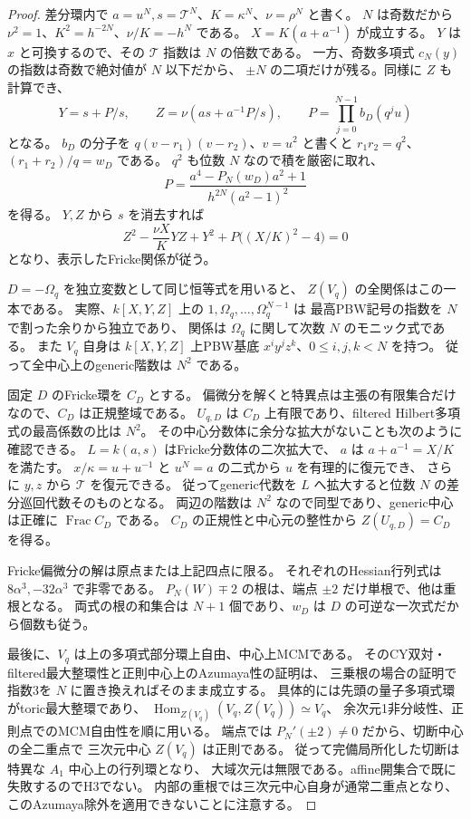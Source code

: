 \begin{proof}
差分環内で $a=u^N,s=\mathcal T^N$、$K=\kappa^N$、$\nu=\rho^N$ と書く。
$N$ は奇数だから $\nu^2=1$、$K^2=h^{-2N}$、$\nu/K=-h^N$ である。
$X=K(a+a^{-1})$ が成立する。
$Y$ は $x$ と可換するので、その $\mathcal T$ 指数は $N$ の倍数である。
一方、奇数多項式 $c_N(y)$ の指数は奇数で絶対値が $N$ 以下だから、
$\pm N$ の二項だけが残る。同様に $Z$ も計算でき、
\[
 Y=s+P/s,\qquad Z=\nu(as+a^{-1}P/s),\qquad
 P=\prod_{j=0}^{N-1}b_D(q^ju)
\]
となる。
$b_D$ の分子を $q(v-r_1)(v-r_2)$、$v=u^2$ と書くと
$r_1r_2=q^2$、$(r_1+r_2)/q=w_D$ である。
$q^2$ も位数 $N$ なので積を厳密に取れ、
\[
 P=\frac{a^4-P_N(w_D)a^2+1}{h^{2N}(a^2-1)^2}
\]
を得る。
$Y,Z$ から $s$ を消去すれば
\[
 Z^2-\frac{\nu X}{K}YZ+Y^2+
 P\bigl((X/K)^2-4\bigr)=0
\]
となり、表示したFricke関係が従う。

$D=-\Omega_q$ を独立変数として同じ恒等式を用いると、
$Z(V_q)$ の全関係はこの一本である。
実際、$k[X,Y,Z]$ 上の $1,\Omega_q,\ldots,\Omega_q^{N-1}$ は
最高PBW記号の指数を $N$ で割った余りから独立であり、
関係は $\Omega_q$ に関して次数 $N$ のモニック式である。
また $V_q$ 自身は $k[X,Y,Z]$ 上PBW基底 $x^iy^jz^k$、$0\le i,j,k<N$ を持つ。
従って全中心上のgeneric階数は $N^2$ である。

固定 $D$ のFricke環を $C_D$ とする。
偏微分を解くと特異点は主張の有限集合だけなので、$C_D$ は正規整域である。
$U_{q,D}$ は $C_D$ 上有限であり、filtered Hilbert多項式の最高係数の比は $N^2$。
その中心分数体に余分な拡大がないことも次のように確認できる。
$L=k(a,s)$ はFricke分数体の二次拡大で、
$a$ は $a+a^{-1}=X/K$ を満たす。
$x/\kappa=u+u^{-1}$ と $u^N=a$ の二式から $u$ を有理的に復元でき、
さらに $y,z$ から $\mathcal T$ を復元できる。
従ってgeneric代数を $L$ へ拡大すると位数 $N$ の差分巡回代数そのものとなる。
両辺の階数は $N^2$ なので同型であり、generic中心は正確に $\operatorname{Frac}C_D$ である。
$C_D$ の正規性と中心元の整性から $Z(U_{q,D})=C_D$ を得る。

Fricke偏微分の解は原点または上記四点に限る。
それぞれのHessian行列式は $8\alpha^3,-32\alpha^3$ で非零である。
$P_N(W)\mp2$ の根は、端点 $\pm2$ だけ単根で、他は重根となる。
両式の根の和集合は $N+1$ 個であり、$w_D$ は $D$ の可逆な一次式だから個数も従う。

最後に、$V_q$ は上の多項式部分環上自由、中心上MCMである。
そのCY双対・filtered最大整環性と正則中心上のAzumaya性の証明は、
三乗根の場合の証明で指数3を $N$ に置き換えればそのまま成立する。
具体的には先頭の量子多項式環がtoric最大整環であり、
$\operatorname{Hom}_{Z(V_q)}(V_q,Z(V_q))\simeq V_q$、
余次元1非分岐性、正則点でのMCM自由性を順に用いる。
端点では $P_N'(\pm2)\ne0$ だから、切断中心の全二重点で
三次元中心 $Z(V_q)$ は正則である。
従って完備局所化した切断は特異な $A_1$ 中心上の行列環となり、
大域次元は無限である。affine開集合で既に失敗するのでH3でない。
内部の重根では三次元中心自身が通常二重点となり、
このAzumaya除外を適用できないことに注意する。
\end{proof}

